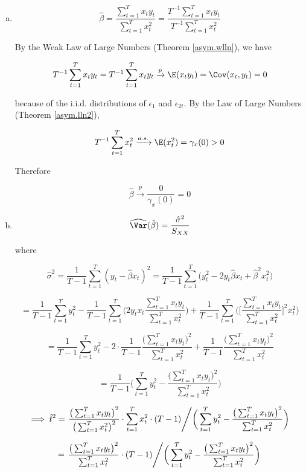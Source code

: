 \begin{enumerate}[(a)]


\item

\[
\hat{\beta} = \frac{\sum_{t=1}^T x_t y_t }{\sum_{t=1}^T x_t^2} = \frac{T^{-1}\sum_{t=1}^T x_t y_t }{T^{-1}\sum_{t=1}^T x_t^2} 
\]

By the Weak Law of Large Numbers (Theorem \ref{asym.wlln}), we have

\[
T^{-1}\sum_{t=1}^T x_t y_t = T^{-1}\sum_{t=1}^T x_t y_t \xrightarrow{p} \E(x_ty_t) = \Cov(x_t, y_t) = 0
\]

because of the i.i.d. distributions of \(\epsilon_{1}\) and \(\epsilon_{2t}\). By the Law of Large Numbers (Theorem \ref{asym.lln2}),

\[
T^{-1}\sum_{t=1}^T x_t^2 \xrightarrow{a.s.} \E(x_t^2) = \gamma_x(0) >0
\]

Therefore

\[
\hat{\beta} \xrightarrow{p} \frac{0}{\gamma_x(0)} = 0
\]


%
%
\item 

\[
\widehat{\Var}(\hat{\beta}) = \frac{\hat{\sigma}^2}{S_{XX}}
\]

where

\[
\hat{\sigma}^2 = \frac{1}{T-1} \sum_{t=1}^T (y_t - \hat{\beta} x_t)^2 = \frac{1}{T-1} \sum_{t=1}^T \big( y_t^2 - 2y_t\hat{\beta} x_t + \hat{\beta}^2x_t^2\big)
\]

\[
= \frac{1}{T-1} \sum_{t=1}^T  y_t^2 - \frac{1}{T-1} \sum_{t=1}^T  \bigg( 2y_t x_t  \frac{\sum_{t=1}^T x_t y_t }{\sum_{t=1}^T x_t^2}\bigg)  +  \frac{1}{T-1} \sum_{t=1}^T  \bigg(  \bigg[ \frac{\sum_{t=1}^T x_t y_t }{\sum_{t=1}^T x_t^2}  \bigg]^2 x_t^2\bigg)
\]

\[
= \frac{1}{T-1} \sum_{t=1}^T  y_t^2 - 2\cdot \frac{1}{T-1} \frac{\big(\sum_{t=1}^T x_t y_t \big)^2}{\sum_{t=1}^T x_t^2} +  \frac{1}{T-1} \frac{\big(\sum_{t=1}^T x_t y_t \big)^2}{\sum_{t=1}^T x_t^2} 
\]

\[
= \frac{1}{T-1}\bigg( \sum_{t=1}^T  y_t^2 -  \frac{\big(\sum_{t=1}^T x_t y_t \big)^2}{\sum_{t=1}^T x_t^2} \bigg)
\]

\[
\implies  \hat{t}^2 =  \left. \frac{\big(\sum_{t=1}^T x_t y_t \big)^2}{\big(\sum_{t=1}^T x_t^2 \big)^2} \cdot \sum_{t=1}^T x_t^2 \cdot (T-1) \middle/ \bigg( \sum_{t=1}^T  y_t^2 -  \frac{\big(\sum_{t=1}^T x_t y_t \big)^2}{\sum_{t=1}^T x_t^2} \bigg) \right.
\]

\[
=  \left. \frac{\big(\sum_{t=1}^T x_t y_t \big)^2}{\sum_{t=1}^T x_t^2 } \cdot (T-1) \middle/ \bigg( \sum_{t=1}^T  y_t^2 -  \frac{\big(\sum_{t=1}^T x_t y_t \big)^2}{\sum_{t=1}^T x_t^2} \bigg) \right.
\]


\end{enumerate}
